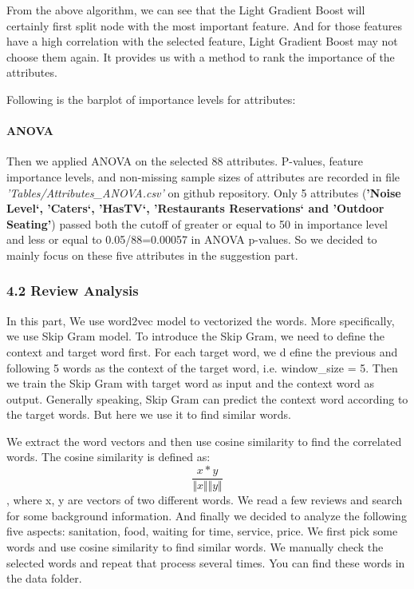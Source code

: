 \documentclass[11pt]{article}
\begin{document}
From the above algorithm, we can see that the Light Gradient Boost will
certainly first split node with the most important feature. And for
those features have a high correlation with the selected feature, Light
Gradient Boost may not choose them again. It provides us with a method
to rank the importance of the attributes.

Following is the barplot of importance levels for attributes: 

    \paragraph{ANOVA}\label{anova}

    Then we applied ANOVA on the selected 88 attributes. P-values, feature
importance levels, and non-missing sample sizes of attributes are
recorded in file \emph{'Tables/Attributes\_ANOVA.csv'} on github
repository. Only 5 attributes (\textbf{'Noise Level`, 'Caters`, 'HasTV`,
'Restaurants Reservations` and 'Outdoor Seating'}) passed both the
cutoff of greater or equal to 50 in importance level and less or equal
to 0.05/88=0.00057 in ANOVA p-values. So we decided to mainly focus on
these five attributes in the suggestion part.

    \subsubsection{4.2 Review Analysis}\label{review-analysis}

    In this part, We use word2vec model to vectorized the words. More
specifically, we use Skip Gram model. To introduce the Skip Gram, we
need to define the context and target word first. For each target word,
we d efine the previous and following 5 words as the context of the
target word, i.e. window\_size = 5. Then we train the Skip Gram with
target word as input and the context word as output. Generally speaking,
Skip Gram can predict the context word according to the target words.
But here we use it to find similar words.

We extract the word vectors and then use cosine similarity to find the
correlated words. The cosine similarity is defined as:
\[\frac{x*y}{\Vert x\Vert\Vert y\Vert}\] , where x, y are vectors of two
different words. We read a few reviews and search for some background
information. And finally we decided to analyze the following five
aspects: sanitation, food, waiting for time, service, price. We first
pick some words and use cosine similarity to find similar words. We
manually check the selected words and repeat that process several times.
You can find these words in the data folder.
\end{document}
